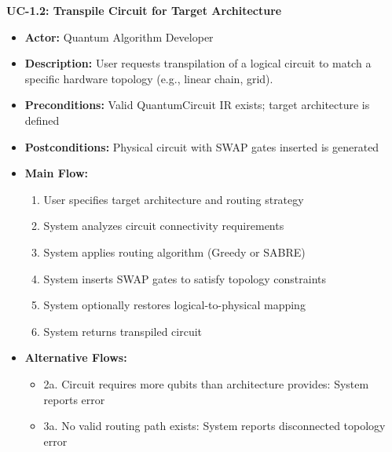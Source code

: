 \textbf{UC-1.2: Transpile Circuit for Target Architecture}
\begin{itemize}
\item \textbf{Actor:} Quantum Algorithm Developer
\item \textbf{Description:} User requests transpilation of a logical circuit to match a specific hardware topology (e.g., linear chain, grid).
\item \textbf{Preconditions:} Valid QuantumCircuit IR exists; target architecture is defined
\item \textbf{Postconditions:} Physical circuit with SWAP gates inserted is generated
\item \textbf{Main Flow:}
\begin{enumerate}
\item User specifies target architecture and routing strategy
\item System analyzes circuit connectivity requirements
\item System applies routing algorithm (Greedy or SABRE)
\item System inserts SWAP gates to satisfy topology constraints
\item System optionally restores logical-to-physical mapping
\item System returns transpiled circuit
\end{enumerate}
\item \textbf{Alternative Flows:}
\begin{itemize}
\item 2a. Circuit requires more qubits than architecture provides: System reports error
\item 3a. No valid routing path exists: System reports disconnected topology error
\end{itemize}
\end{itemize}

